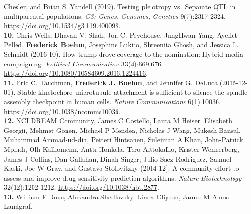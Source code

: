 \documentclass[
  10pt,
]
{article}
\begin{document}
Chesler\normalsize , and \normalsize Brian S. Yandell (2019). Testing
pleiotropy vs.~Separate QTL in multiparental populations. \emph{G3:
Genes, Genomes, Genetics} 9(7):2317-2324.
\url{https://doi.org/10.1534/g3.119.400098}.\\
\textbf{10.} \normalsize \normalsize Chris Wells\normalsize ,
\normalsize Dhavan V. Shah\normalsize , \normalsize Jon C.
Pevehouse\normalsize , \normalsize JungHwan Yang\normalsize ,
\normalsize Ayellet Pelled\normalsize ,
\textbf{\normalsize Frederick Boehm}\normalsize , \normalsize Josephine
Lukito\normalsize , \normalsize Shreenita Ghosh\normalsize , and
\normalsize Jessica L. Schmidt (2016-10). How trump drove coverage to
the nomination: Hybrid media campaigning. \emph{Political Communication}
33(4):669-676. \url{https://doi.org/10.1080/10584609.2016.1224416}.\\
\textbf{11.} \normalsize \normalsize Eric C. Tauchman\normalsize ,
\textbf{\normalsize Frederick J. Boehm}\normalsize , and
\normalsize Jennifer G. DeLuca (2015-12-01). Stable
kinetochore--microtubule attachment is sufficient to silence the spindle
assembly checkpoint in human cells. \emph{Nature Communications}
6(1):10036. \url{https://doi.org/10.1038/ncomms10036}.\\
\textbf{12.} \normalsize NCI DREAM Community\normalsize ,
\normalsize James C Costello\normalsize , \normalsize Laura M
Heiser\normalsize , \normalsize Elisabeth Georgii\normalsize ,
\normalsize Mehmet Gönen\normalsize , \normalsize Michael P
Menden\normalsize , \normalsize Nicholas J Wang\normalsize ,
\normalsize Mukesh Bansal\normalsize , \normalsize Muhammad
Ammad-ud-din\normalsize , \normalsize Petteri Hintsanen\normalsize ,
\normalsize Suleiman A Khan\normalsize , \normalsize John-Patrick
Mpindi\normalsize , \normalsize Olli Kallioniemi\normalsize ,
\normalsize Antti Honkela\normalsize , \normalsize Tero
Aittokallio\normalsize , \normalsize Krister Wennerberg\normalsize ,
\normalsize James J Collins\normalsize , \normalsize Dan
Gallahan\normalsize , \normalsize Dinah Singer\normalsize ,
\normalsize Julio Saez-Rodriguez\normalsize , \normalsize Samuel
Kaski\normalsize , \normalsize Joe W Gray\normalsize , and
\normalsize Gustavo Stolovitzky (2014-12). A community effort to assess
and improve drug sensitivity prediction algorithms. \emph{Nature
Biotechnology} 32(12):1202-1212.
\url{https://doi.org/10.1038/nbt.2877}.\\
\textbf{13.} \normalsize \normalsize William F Dove\normalsize ,
\normalsize Alexandra Shedlovsky\normalsize , \normalsize Linda
Clipson\normalsize , \normalsize James M Amos-Landgraf\normalsize ,
\end{document}
